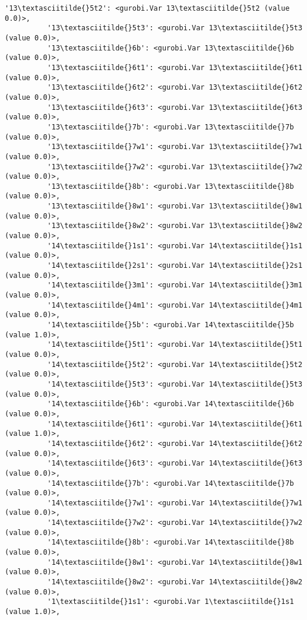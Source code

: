 \documentclass[11pt]{article}
\begin{document}
\begin{Verbatim}[commandchars=\\\{\}]
          '13\textasciitilde{}5t2': <gurobi.Var 13\textasciitilde{}5t2 (value 0.0)>,
          '13\textasciitilde{}5t3': <gurobi.Var 13\textasciitilde{}5t3 (value 0.0)>,
          '13\textasciitilde{}6b': <gurobi.Var 13\textasciitilde{}6b (value 0.0)>,
          '13\textasciitilde{}6t1': <gurobi.Var 13\textasciitilde{}6t1 (value 0.0)>,
          '13\textasciitilde{}6t2': <gurobi.Var 13\textasciitilde{}6t2 (value 0.0)>,
          '13\textasciitilde{}6t3': <gurobi.Var 13\textasciitilde{}6t3 (value 0.0)>,
          '13\textasciitilde{}7b': <gurobi.Var 13\textasciitilde{}7b (value 0.0)>,
          '13\textasciitilde{}7w1': <gurobi.Var 13\textasciitilde{}7w1 (value 0.0)>,
          '13\textasciitilde{}7w2': <gurobi.Var 13\textasciitilde{}7w2 (value 0.0)>,
          '13\textasciitilde{}8b': <gurobi.Var 13\textasciitilde{}8b (value 0.0)>,
          '13\textasciitilde{}8w1': <gurobi.Var 13\textasciitilde{}8w1 (value 0.0)>,
          '13\textasciitilde{}8w2': <gurobi.Var 13\textasciitilde{}8w2 (value 0.0)>,
          '14\textasciitilde{}1s1': <gurobi.Var 14\textasciitilde{}1s1 (value 0.0)>,
          '14\textasciitilde{}2s1': <gurobi.Var 14\textasciitilde{}2s1 (value 0.0)>,
          '14\textasciitilde{}3m1': <gurobi.Var 14\textasciitilde{}3m1 (value 0.0)>,
          '14\textasciitilde{}4m1': <gurobi.Var 14\textasciitilde{}4m1 (value 0.0)>,
          '14\textasciitilde{}5b': <gurobi.Var 14\textasciitilde{}5b (value 1.0)>,
          '14\textasciitilde{}5t1': <gurobi.Var 14\textasciitilde{}5t1 (value 0.0)>,
          '14\textasciitilde{}5t2': <gurobi.Var 14\textasciitilde{}5t2 (value 0.0)>,
          '14\textasciitilde{}5t3': <gurobi.Var 14\textasciitilde{}5t3 (value 0.0)>,
          '14\textasciitilde{}6b': <gurobi.Var 14\textasciitilde{}6b (value 0.0)>,
          '14\textasciitilde{}6t1': <gurobi.Var 14\textasciitilde{}6t1 (value 1.0)>,
          '14\textasciitilde{}6t2': <gurobi.Var 14\textasciitilde{}6t2 (value 0.0)>,
          '14\textasciitilde{}6t3': <gurobi.Var 14\textasciitilde{}6t3 (value 0.0)>,
          '14\textasciitilde{}7b': <gurobi.Var 14\textasciitilde{}7b (value 0.0)>,
          '14\textasciitilde{}7w1': <gurobi.Var 14\textasciitilde{}7w1 (value 0.0)>,
          '14\textasciitilde{}7w2': <gurobi.Var 14\textasciitilde{}7w2 (value 0.0)>,
          '14\textasciitilde{}8b': <gurobi.Var 14\textasciitilde{}8b (value 0.0)>,
          '14\textasciitilde{}8w1': <gurobi.Var 14\textasciitilde{}8w1 (value 0.0)>,
          '14\textasciitilde{}8w2': <gurobi.Var 14\textasciitilde{}8w2 (value 0.0)>,
          '1\textasciitilde{}1s1': <gurobi.Var 1\textasciitilde{}1s1 (value 1.0)>,

\end{Verbatim}
\end{document}
